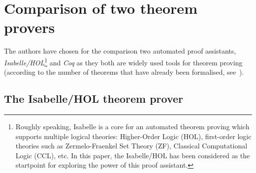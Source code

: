 \documentclass[article]{aaltoseries}
\begin{document}



		




\section{Comparison of two theorem provers}
\label{sec:comparison}

The authors have chosen for the comparison two automated proof assistants, \textit{Isabelle/HOL}\footnote{Roughly speaking, Isabelle is a core for an automated theorem proving which supports multiple logical theories: Higher-Order Logic (HOL), first-order logic theories such as Zermelo-Fraenkel Set Theory (ZF), Classical Computational Logic (CCL), etc. In this paper, the Isabelle/HOL has been considered as the startpoint for exploring the power of this proof assistant.} and \textit{Coq} as they both are widely used tools for theorem proving (according to the number of theorems that have already been formalised, see~\cite{Wiedijk100}).



\subsection{The Isabelle/HOL theorem prover}
\label{sec:prover_isabelle}
\end{document}
